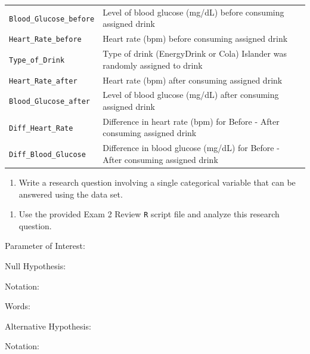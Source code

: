 \documentclass[
]{report}
\providecommand{\tightlist}{%
  \setlength{\itemsep}{0pt}\setlength{\parskip}{0pt}}
\newcommand{\rgi}{\hspace{24pt}}  %
\begin{document}
\begin{longtable}[]{@{}
  >{\raggedright\arraybackslash}p{}
  >{\raggedright\arraybackslash}p{}@{}}
\texttt{Blood\_Glucose\_before} & Level of blood glucose (mg/dL) before consuming assigned drink \\
\texttt{Heart\_Rate\_before} & Heart rate (bpm) before consuming assigned drink \\
\texttt{Type\_of\_Drink} & Type of drink (EnergyDrink or Cola) Islander was randomly assigned to drink \\
\texttt{Heart\_Rate\_after} & Heart rate (bpm) after consuming assigned drink \\
\texttt{Blood\_Glucose\_after} & Level of blood glucose (mg/dL) after consuming assigned drink \\
\texttt{Diff\_Heart\_Rate} & Difference in heart rate (bpm) for Before - After consuming assigned drink \\
\texttt{Diff\_Blood\_Glucose} & Difference in blood glucose (mg/dL) for Before - After consuming assigned drink \\
\bottomrule
\end{longtable}

\begin{enumerate}
\def\labelenumi{\arabic{enumi}.}
\tightlist
\item
  Write a research question involving a single categorical variable that can be answered using the data set.
\end{enumerate}

\vspace{0.8in}

\begin{enumerate}
\def\labelenumi{\arabic{enumi}.}
\setcounter{enumi}{1}
\tightlist
\item
  Use the provided Exam 2 Review \texttt{R} script file and analyze this research question.
\end{enumerate}

\rgi Parameter of Interest:

\vspace{0.3in}

\rgi Null Hypothesis:

\rgi \rgi Notation:

\vspace{0.3in}

\rgi \rgi Words:

\vspace{0.5in}

\rgi Alternative Hypothesis:

\rgi \rgi Notation:

\vspace{0.3in}
\end{document}
